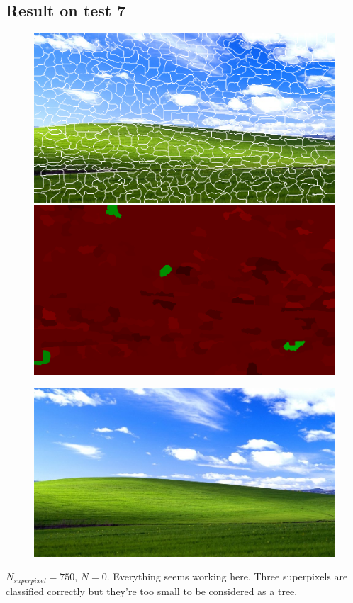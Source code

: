 \documentclass[a4paper,titlepaget]{article}
\begin{document}
\subsection{Result on test 7}
\begin{figure}[htpb] 
	\centering
	\begin{minipage}{.3\textwidth}
		\includegraphics[width=1.7\textwidth]{images/results/7seg} 
	\end{minipage}
	\hspace{.25\textwidth}
	\begin{minipage}{.3\textwidth}
		\includegraphics[width=1.7\textwidth]{images/results/7map}
	\end{minipage}  
\end{figure}
\begin{figure}[htpb]
	\centering
	\includegraphics[width=.9\textwidth]{images/results/7fin}
\end{figure}
$N_{superpixel}=750$, $N=0$. Everything seems working here. Three superpixels are classified correctly but they're too small to be considered as a tree.
\newpage
\end{document}
